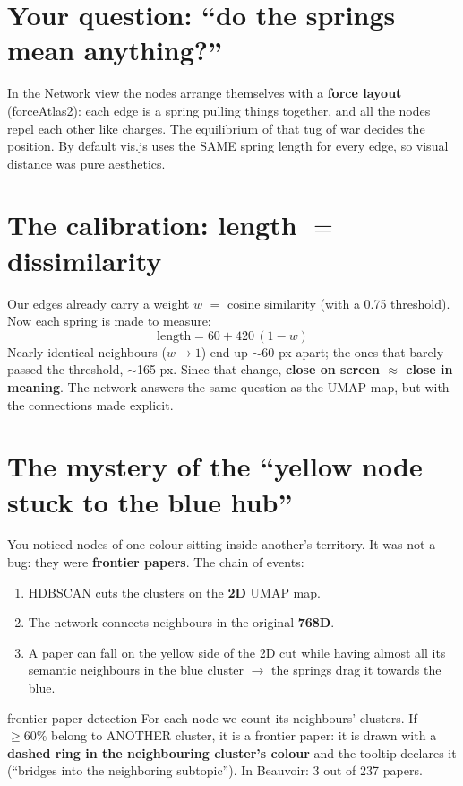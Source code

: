 \documentclass[11pt,a4paper]{article}
\begin{document}

\section{Your question: ``do the springs mean anything?''}

In the Network view the nodes arrange themselves with a \textbf{force layout} (forceAtlas2):
each edge is a spring pulling things together, and all the nodes repel each other like charges.
The equilibrium of that tug of war decides the position. By default vis.js uses the SAME spring
length for every edge, so visual distance was pure aesthetics.

\section{The calibration: length $=$ dissimilarity}

Our edges already carry a weight $w$ $=$ cosine similarity (with a 0.75 threshold). Now each
spring is made to measure:
\[
\mathrm{length} = 60 + 420\,(1 - w)
\]
Nearly identical neighbours ($w \to 1$) end up $\sim$60 px apart; the ones that barely passed
the threshold, $\sim$165 px. Since that change, \textbf{close on screen $\approx$ close in
meaning}. The network answers the same question as the UMAP map, but with the connections made
explicit.

\section{The mystery of the ``yellow node stuck to the blue hub''}

You noticed nodes of one colour sitting inside another's territory. It was not a bug: they were
\textbf{frontier papers}. The chain of events:

\begin{enumerate}
  \item HDBSCAN cuts the clusters on the \textbf{2D} UMAP map.
  \item The network connects neighbours in the original \textbf{768D}.
  \item A paper can fall on the yellow side of the 2D cut while having almost all its semantic
        neighbours in the blue cluster $\rightarrow$ the springs drag it towards the blue.
\end{enumerate}

\begin{concepto}{frontier paper detection}
For each node we count its neighbours' clusters. If $\geq 60\%$ belong to ANOTHER cluster, it
is a frontier paper: it is drawn with a \textbf{dashed ring in the neighbouring cluster's
colour} and the tooltip declares it (``bridges into the neighboring subtopic''). In Beauvoir:
3 out of 237 papers.
\end{concepto}
\end{document}
